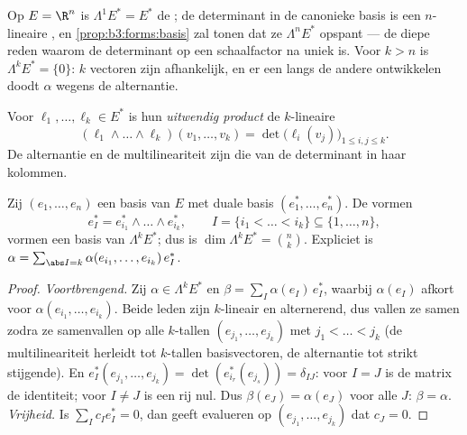 \begin{example}
Op $E = \R^n$ is $\Lambda^1E^* = E^*$ de ; de
determinant in de canonieke basis is een $n$-lineaire
, en \cref{prop:b3:forms:basis} zal tonen dat ze
$\Lambda^nE^*$ opspant --- de diepe reden waarom de determinant
op een schaalfactor na uniek is. Voor $k > n$ is $\Lambda^kE^* =
\{0\}$: $k$ vectoren zijn afhankelijk, en er een langs de andere
ontwikkelen doodt $\alpha$ wegens de alternantie.
\end{example}

\begin{definition}\label{def:b3:forms:wedge}
Voor $\ell_1, \dots, \ell_k \in E^*$ is hun \emph{uitwendig
product} de $k$-lineaire 
\[
(\ell_1 \wedge \dots \wedge \ell_k)(v_1, \dots, v_k)
= \det\bigl(\ell_i(v_j)\bigr)_{1 \leq i, j \leq k} .
\]
De alternantie en de multilineariteit zijn die van de determinant
in haar kolommen.
\end{definition}

\begin{proposition}\label{prop:b3:forms:basis}
Zij $(e_1, \dots, e_n)$ een basis van $E$ met duale basis
$(e_1^*, \dots, e_n^*)$. De vormen
\[
e_I^* = e_{i_1}^* \wedge \dots \wedge e_{i_k}^*,
\qquad I = \{i_1 < \dots < i_k\} \subseteq \{1, \dots, n\},
\]
vormen een basis van $\Lambda^kE^*$; dus is $\dim\Lambda^kE^* =
\binom nk$. Expliciet is $\alpha = \sum_{\abs I =
k}\alpha(e_{i_1}, \dots, e_{i_k})\,e_I^*$.
\end{proposition}

\begin{proof}
\emph{Voortbrengend.} Zij $\alpha \in \Lambda^kE^*$ en $\beta =
\sum_I\alpha(e_I)\,e_I^*$, waarbij $\alpha(e_I)$ afkort voor
$\alpha(e_{i_1}, \dots, e_{i_k})$. Beide leden zijn $k$-lineair
en alternerend, dus vallen ze samen zodra ze samenvallen op alle
$k$-tallen $(e_{j_1}, \dots, e_{j_k})$ met $j_1 < \dots < j_k$
(de multilineariteit herleidt tot $k$-tallen basisvectoren, de
alternantie tot strikt stijgende). En $e_I^*(e_{j_1}, \dots,
e_{j_k}) = \det(e_{i_r}^*(e_{j_s})) = \delta_{IJ}$: voor $I = J$
is de matrix de identiteit; voor $I \neq J$ is een rij nul. Dus
$\beta(e_J) = \alpha(e_J)$ voor alle $J$: $\beta = \alpha$.
\emph{Vrijheid.} Is $\sum_I c_Ie_I^* = 0$, dan geeft evalueren op
$(e_{j_1}, \dots, e_{j_k})$ dat $c_J = 0$.
\end{proof}

